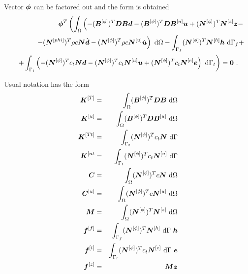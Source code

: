 Vector $\mbox{\boldmath$\phi$}$ can be factored out and the form is obtained
\begin{eqnarray}
&& \mbf{\phi}^T \left(\int_{\Omega} \left(
- (\mbf{B}^{[\phi]})^T \mbf{D} \mbf{B} \mbf{d} 
- (\mbf{B}^{[\phi]})^T \mbf{D} \mbf{B}^{[u]} \mbf{u}
+ (\mbf{N}^{[\phi]})^T \mbf{N}^{[z]} \mbf{z} -
\right.\right. \\ && \left.\left. 
- (\mbf{N}^{[phi]})^T \rho c \mbf{N} \dot{\mbf{d}}
- (\mbf{N}^{[\phi]})^T \rho c \mbf{N}^{[u]} \dot{\mbf{u}}
\right) {\ \rm d}\Omega -
\int_{\Gamma_f} (\mbf{N}^{[\phi]})^T \mbf{N}^{[h]} \mbf{h} {\ \rm d}\Gamma_f +
\right. \\ && \left. 
+ \int_{\Gamma_t} \left(
- (\mbf{N}^{[\phi]})^T c_t \mbf{N} \mbf{d}
- (\mbf{N}^{[\phi]})^T c_t \mbf{N}^{[u]} \mbf{u}
+ (\mbf{N}^{[\phi]})^T c_t \mbf{N}^{[e]} \mbf{e}
\right) {\ \rm d}\Gamma_t \right) = \mbf{0}\ .\ \ \ 
\end{eqnarray}

Usual notation has the form
\begin{eqnarray}\label{eqcondmat}
\mbf{K}^{[T]} &=& \int_{\Omega} (\mbf{B}^{[\phi]})^T \mbf{D} \mbf{B}{\ \rm d}\Omega
\\
\mbf{K}^{[u]} &=& \int_{\Omega} (\mbf{B}^{[\phi]})^T \mbf{D} \mbf{B}^{[u]}{\ \rm d}\Omega
\\
\mbf{K}^{[Tt]} &=& \int_{\Gamma_t} (\mbf{N}^{[\phi]})^T c_t \mbf{N}{\ \rm d}\Gamma
\\
\mbf{K}^{[ut} &=& \int_{\Gamma_t} (\mbf{N}^{[\phi]})^T c_t \mbf{N}^{[u]}{\ \rm d}\Gamma
\\
\mbf{C} &=& \int_{\Omega} (\mbf{N}^{[\phi]})^T c \mbf{N} {\ \rm d}\Omega
\\
\mbf{C}^{[u]} &=& \int_{\Omega} (\mbf{N}^{[\phi]})^T c \mbf{N}^{[u]} {\ \rm d}\Omega
\\
\mbf{M} &=& \int_{\Omega} (\mbf{N}^{[\phi]})^T \mbf{N}^{[z]} {\ \rm d}\Omega
\\
\mbf{f}^{[f]} &=& \int_{\Gamma_f} (\mbf{N}^{[\phi]})^T  \mbf{N}^{[h]} {\ \rm d}\Gamma\ \mbf{h}
\\
\mbf{f}^{[t]} &=& \int_{\Gamma_t} (\mbf{N}^{[\phi]})^T  c_t \mbf{N}^{[e]} {\ \rm d}\Gamma\ \mbf{e}
\\ \label{eqsourcevector}
\mbf{f}^{[z]} &=& \mbf{M} \mbf{z}
\end{eqnarray}


